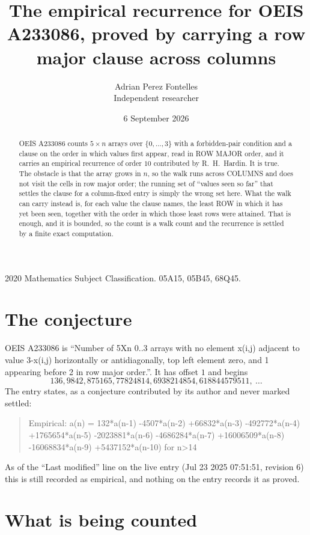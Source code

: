 \documentclass[11pt,a4paper]{article}
\title{The empirical recurrence for OEIS A233086, proved by carrying a row major clause across
columns}
\author{Adrian Perez Fontelles\\ \small Independent researcher}
\date{6 September 2026}
\theoremstyle{plain}
\theoremstyle{definition}
\begin{document}
\maketitle

\begin{abstract}
OEIS A233086 counts $5\times n$ arrays over $\{0,\dots,3\}$ with a forbidden-pair
condition and a clause on the order in which values first appear, read in ROW MAJOR order, and
it carries an empirical recurrence of order $10$ contributed by R.~H.~Hardin. It is true.
The obstacle is that the array grows in $n$, so the walk runs across COLUMNS and does not visit
the cells in row major order; the running set of ``values seen so far'' that settles the clause
for a column-fixed entry is simply the wrong set here. What the walk can carry instead is, for
each value the clause names, the least ROW in which it has yet been seen, together with the
order in which those least rows were attained. That is enough, and it is bounded, so the count
is a walk count and the recurrence is settled by a finite exact computation.
\end{abstract}

\noindent\small 2020 Mathematics Subject Classification. 05A15, 05B45, 68Q45.\normalsize

\section{The conjecture}

OEIS A233086 is ``Number of 5Xn 0..3 arrays with no element x(i,j) adjacent to value 3-x(i,j) horizontally or antidiagonally, top left element zero, and 1 appearing before 2 in row major order.''. It has offset $1$ and begins
\[
136, 9842, 875165, 77824814, 6938214854, 618844579511,\ \dots
\]
The entry states, as a conjecture contributed by its author and never marked settled:
\begin{quote}
Empirical: a(n) = 132*a(n-1) -4507*a(n-2) +66832*a(n-3) -492772*a(n-4) +1765654*a(n-5) -2023881*a(n-6) -4686284*a(n-7) +16006509*a(n-8) -16068834*a(n-9) +5437152*a(n-10) for n>14
\end{quote}
As of the ``Last modified'' line on the live entry (Jul 23 2025 07:51:51, revision 6) this is still
recorded as empirical, and nothing on the entry records it as proved.

\section{What is being counted}
\end{document}
